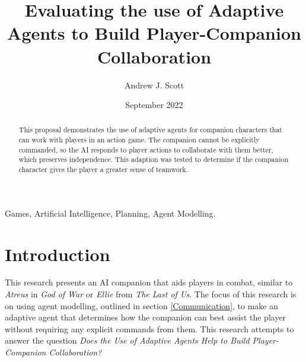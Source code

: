 \documentclass{IEEEtran}
\title{Evaluating the use of Adaptive Agents to Build Player-Companion Collaboration}
\author{Andrew J. Scott}
\date{September 2022}
\begin{document}
	\maketitle

\begin{abstract}
This proposal demonstrates the use of adaptive agents for companion characters that can work with players in an action game. The companion cannot be explicitly commanded, so the AI responds to player actions to collaborate with them better, which preserves independence. This adaption was tested to determine if the companion character gives the player a greater sense of teamwork.
\end{abstract}

 \begin{IEEEkeywords}
Games, Artificial Intelligence, Planning, Agent Modelling.
\end{IEEEkeywords}

\section{Introduction}
\label{Intro}

This research presents an AI companion that aids players in combat, similar to \textit{Atreus} in \textit{God of War} or \textit{Ellie} from \textit{The Last of Us}. The focus of this research is on using agent modelling, outlined in section \ref{Communication}, to make an adaptive agent that determines how the companion can best assist the player without requiring any explicit commands from them. This research attempts to answer the question \textit{Does the Use of Adaptive Agents Help to Build Player-Companion Collaboration?}


\end{document}
